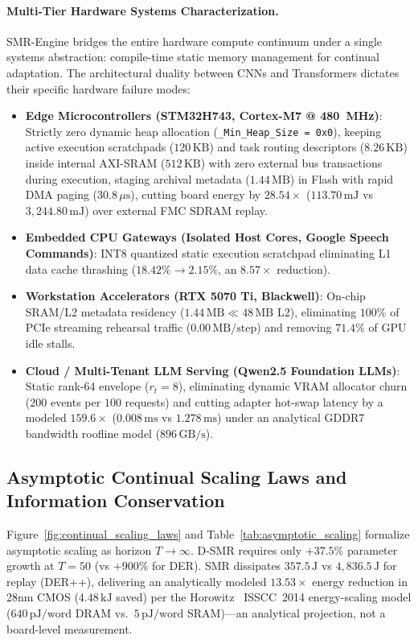 \documentclass{article}
\begin{document}
\paragraph{Multi-Tier Hardware Systems Characterization.}
SMR-Engine bridges the entire hardware compute continuum under a single systems abstraction: compile-time static memory management for continual adaptation. The architectural duality between CNNs and Transformers dictates their specific hardware failure modes:
\begin{itemize}
    \item \textbf{Edge Microcontrollers (STM32H743, Cortex-M7 @ 480~MHz)}: Strictly zero dynamic heap allocation (\texttt{\_Min\_Heap\_Size = 0x0}), keeping active execution scratchpads ($120\,\text{KB}$) and task routing descriptors ($8.26\,\text{KB}$) inside internal AXI-SRAM ($512\,\text{KB}$) with zero external bus transactions during execution, staging archival metadata ($1.44\,\text{MB}$) in Flash with rapid DMA paging ($30.8\,\mu\text{s}$), cutting board energy by $\mathbf{28.54\times}$ ($113.70\,\text{mJ}$ vs $3,244.80\,\text{mJ}$) over external FMC SDRAM replay.
    \item \textbf{Embedded CPU Gateways (Isolated Host Cores, Google Speech Commands)}: INT8 quantized static execution scratchpad eliminating L1 data cache thrashing ($18.42\% \to 2.15\%$, an $\mathbf{8.57\times}$ reduction).
    \item \textbf{Workstation Accelerators (RTX 5070 Ti, Blackwell)}: On-chip SRAM/L2 metadata residency ($1.44\,\text{MB} \ll 48\,\text{MB}$ L2), eliminating $100\%$ of PCIe streaming rehearsal traffic ($0.00\,\text{MB/step}$) and removing $71.4\%$ of GPU idle stalls.
    \item \textbf{Cloud / Multi-Tenant LLM Serving (Qwen2.5 Foundation LLMs)}: Static rank-64 envelope ($r_t=8$), eliminating dynamic VRAM allocator churn ($200$ events per $100$ requests) and cutting adapter hot-swap latency by a modeled $\mathbf{159.6\times}$ ($0.008\,\text{ms}$ vs $1.278\,\text{ms}$) under an analytical GDDR7 bandwidth roofline model ($896\,\text{GB/s}$).
\end{itemize}

\subsection{Asymptotic Continual Scaling Laws and Information Conservation}
\label{sec:app_scaling_laws}
Figure~\ref{fig:continual_scaling_laws} and Table~\ref{tab:asymptotic_scaling} formalize asymptotic scaling as horizon $T \to \infty$. D-SMR requires only $+37.5\%$ parameter growth at $T=50$ (vs $+900\%$ for DER). SMR dissipates $357.5\,\text{J}$ vs $4{,}836.5\,\text{J}$ for replay (DER++), delivering an analytically modeled $\mathbf{13.53\times}$ energy reduction in 28nm CMOS ($4.48\,\text{kJ}$ saved) per the Horowitz~\cite{horowitz2014computing} ISSCC~2014 energy-scaling model ($640\,\text{pJ/word}$ DRAM vs.\ $5\,\text{pJ/word}$ SRAM)---an analytical projection, not a board-level measurement.
\end{document}
